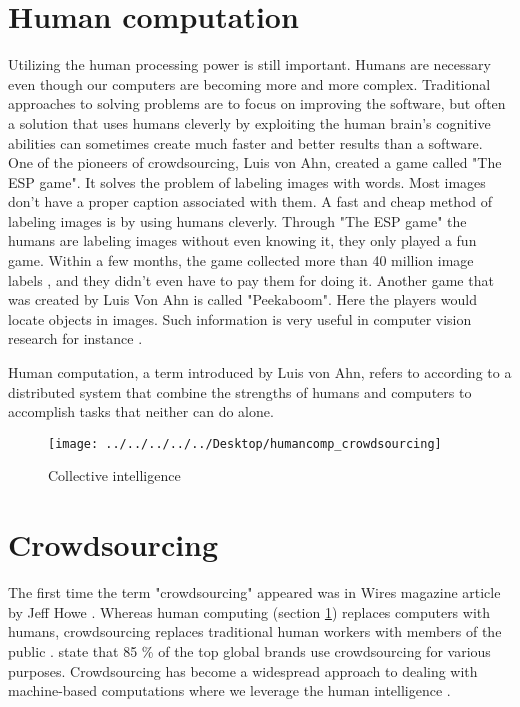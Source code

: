 \section{Human computation}\label{sec:humancomputation}
Utilizing the human processing power is still important. Humans are necessary even though our computers are becoming more and more complex. Traditional approaches to solving problems are to focus on improving the software, but often a solution that uses humans cleverly by exploiting the human brain's cognitive abilities can sometimes create much faster and better results than a software. One of the pioneers of crowdsourcing, Luis von Ahn, created a game called "The ESP game". It solves the problem of labeling images with words. Most images don't have a proper caption associated with them. A fast and cheap method of labeling images is by using humans cleverly. Through "The ESP game" the humans are labeling images without even knowing it, they only played a fun game. Within a few months, the game collected more than 40 million image labels \citep{VonAhn2008}, and they didn't even have to pay them for doing it. Another game that was created by Luis Von Ahn is called "Peekaboom". Here the players would locate objects in images. Such information is very useful in computer vision research for instance \citep{VonAhn2008}.   

Human computation, a term introduced by Luis von Ahn, refers to according to \cite{Quinn2011} a distributed system that combine the strengths of humans and computers to accomplish tasks that neither can do alone. 

\begin{figure}[H]
	\centering
	\texttt{[image: ../../../../../Desktop/humancomp\_crowdsourcing]}
	\caption{Collective intelligence \citep{Quinn2011}}
	\label{fig:humancompcrowdsourcing}
\end{figure}


\section{Crowdsourcing}\label{sec:crowdsourcing}

The first time the term "crowdsourcing" appeared was in Wires magazine article by Jeff Howe \citep{Howe2006}. Whereas human computing (section \ref{sec:humancomputation}) replaces computers with humans, crowdsourcing replaces traditional human workers with members of the public \citep{Quinn2011}. \cite{EYeka2015} state that 85 \% of the top global brands use crowdsourcing for various purposes. Crowdsourcing has become a widespread approach to dealing with machine-based computations where we leverage the human intelligence \citep{Gadiraju2015}.

